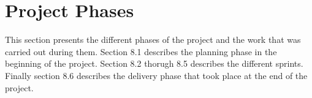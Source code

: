 \chapter{Project Phases}
	
	This section presents the different phases of the project and the work that was carried out during them.
	Section 8.1 describes the planning phase in the beginning of the project. Section 8.2 thorugh 8.5 describes the different sprints. Finally section 8.6 describes the delivery phase that took place at the end of the project.